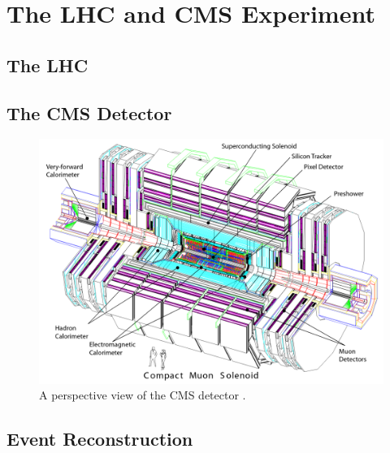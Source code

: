 \section{The LHC and CMS Experiment}
\label{sec:cms}

\subsection{The LHC}

\subsection{The CMS Detector}

\begin{figure}[H]
    \centering
    \includegraphics[scale=0.4]{Figures/CMS_Detector.png}
    \caption{A perspective view of the CMS detector \cite{CMS_Setup}.}
    \label{fig:CMS_Schematic}
\end{figure}

\subsection{Event Reconstruction}